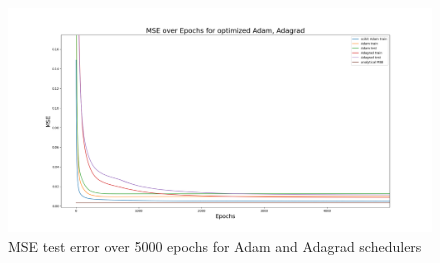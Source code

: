 \documentclass[onecolumn,10pt,cleanfoot]{asme2ej}
\begin{document}
\begin{figure}[H]
\centerline{\includegraphics[width=7in]{figure/5000e_adam_v_adagrad.png}}
\caption{MSE test error over 5000 epochs for Adam and Adagrad schedulers}
\label{adam_v_adagrad}
\end{figure}
\end{document}
